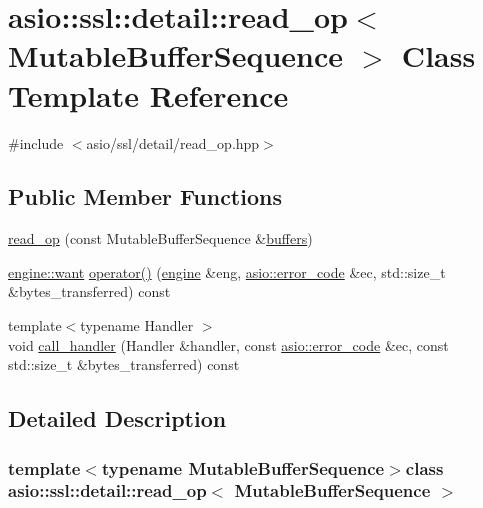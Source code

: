 \hypertarget{classasio_1_1ssl_1_1detail_1_1read__op}{}\section{asio\+:\+:ssl\+:\+:detail\+:\+:read\+\_\+op$<$ Mutable\+Buffer\+Sequence $>$ Class Template Reference}
\label{classasio_1_1ssl_1_1detail_1_1read__op}


{\ttfamily \#include $<$asio/ssl/detail/read\+\_\+op.\+hpp$>$}

\subsection*{Public Member Functions}
\begin{DoxyCompactItemize}
\item 
\hyperlink{classasio_1_1ssl_1_1detail_1_1read__op_a331c42f11ffe67dd1d6e236d4cabe462}{read\+\_\+op} (const Mutable\+Buffer\+Sequence \&\hyperlink{group__async__read_ga54dede45c3175148a77fe6635222c47d}{buffers})
\item 
\hyperlink{classasio_1_1ssl_1_1detail_1_1engine_ab9812153941a6a93c9095f4e5ca8f915}{engine\+::want} \hyperlink{classasio_1_1ssl_1_1detail_1_1read__op_a4572f4c46ad5a6190f9597c2daaa3817}{operator()} (\hyperlink{classasio_1_1ssl_1_1detail_1_1engine}{engine} \&eng, \hyperlink{classasio_1_1error__code}{asio\+::error\+\_\+code} \&ec, std\+::size\+\_\+t \&bytes\+\_\+transferred) const 
\item 
{\footnotesize template$<$typename Handler $>$ }\\void \hyperlink{classasio_1_1ssl_1_1detail_1_1read__op_a484687e690e1ef1620eb75567b0ed1b1}{call\+\_\+handler} (Handler \&handler, const \hyperlink{classasio_1_1error__code}{asio\+::error\+\_\+code} \&ec, const std\+::size\+\_\+t \&bytes\+\_\+transferred) const 
\end{DoxyCompactItemize}


\subsection{Detailed Description}
\subsubsection*{template$<$typename Mutable\+Buffer\+Sequence$>$class asio\+::ssl\+::detail\+::read\+\_\+op$<$ Mutable\+Buffer\+Sequence $>$}



